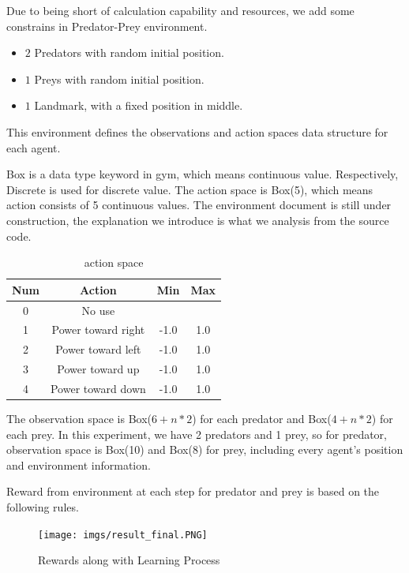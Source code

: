 \documentclass[11pt,twocolumn]{jarticle} %
\begin{document}
Due to being short of calculation capability and resources, we add some constrains in Predator-Prey environment.
\begin{itemize}
  \item $2$ Predators with random initial position.
  \item $1$ Preys with random initial position.
  \item $1$ Landmark, with a fixed position in middle.
\end{itemize}
This environment defines the observations and action spaces data structure for each agent. \par
Box is a data type keyword in gym\cite{gym}, which means continuous value. Respectively, Discrete is used for discrete value. The action space is Box(5), which means action consists of 5 continuous values. The environment document is still under construction, the explanation we introduce is what we analysis from the source code. 
\begin{table}[ht]
 \caption{action space} 
 \label{tbl:action}
  \begin{center}
    \begin{tabular}{c|ccc}
  Num  & Action & Min & Max\\
  \hline \hline
  0 & No use &  & \\
  1 & Power toward right & -1.0 & 1.0\\
  2 & Power toward left & -1.0 & 1.0\\
  3 & Power toward up & -1.0 & 1.0\\
  4 & Power toward down & -1.0 & 1.0\\\hline
    \end{tabular}
  \end{center}
\end{table}
The observation space is Box($6+n*2$) for each predator and Box($4+n*2$) for each prey. In this experiment, we have 2 predators and 1 prey, so for predator, observation space is Box(10) and Box(8) for prey, including every agent's position and environment information. \par
Reward from environment at each step for predator and prey is based on the following rules. \par


\begin{figure}[h]
 \begin{center}
  \texttt{[image: imgs/result\_final.PNG]}
  \caption{Rewards along with Learning Process}
  \label{fig:tensor_result}
 \end{center}
\end{figure}
\end{document}
